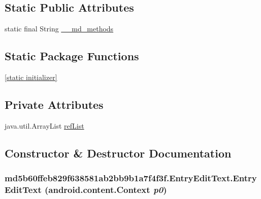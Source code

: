 \subsection*{Static Public Attributes}
\begin{CompactItemize}
\item 
static final String \hyperlink{classmd5b60ffeb829f638581ab2bb9b1a7f4f3f_1_1_entry_edit_text_2ad10bc93868a1a331ee5c3f0f6447b6}{\_\-\_\-md\_\-methods}
\end{CompactItemize}
\subsection*{Static Package Functions}
\begin{CompactItemize}
\item 
\hyperlink{classmd5b60ffeb829f638581ab2bb9b1a7f4f3f_1_1_entry_edit_text_1bcb36e7b2e5e9adfbc72e37a3f9a778}{\mbox{[}static initializer\mbox{]}}
\end{CompactItemize}
\subsection*{Private Attributes}
\begin{CompactItemize}
\item 
java.util.ArrayList \hyperlink{classmd5b60ffeb829f638581ab2bb9b1a7f4f3f_1_1_entry_edit_text_3919b30a60433804ec3826c0a1cafe36}{refList}
\end{CompactItemize}


\subsection{Constructor \& Destructor Documentation}
\hypertarget{classmd5b60ffeb829f638581ab2bb9b1a7f4f3f_1_1_entry_edit_text_43fa3f79c97f30676559ff6ab8a5773d}{
\subsubsection[{EntryEditText}]{\setlength{\rightskip}{0pt plus 5cm}md5b60ffeb829f638581ab2bb9b1a7f4f3f.EntryEditText.EntryEditText (android.content.Context {\em p0})}}
\label{classmd5b60ffeb829f638581ab2bb9b1a7f4f3f_1_1_entry_edit_text_43fa3f79c97f30676559ff6ab8a5773d}


